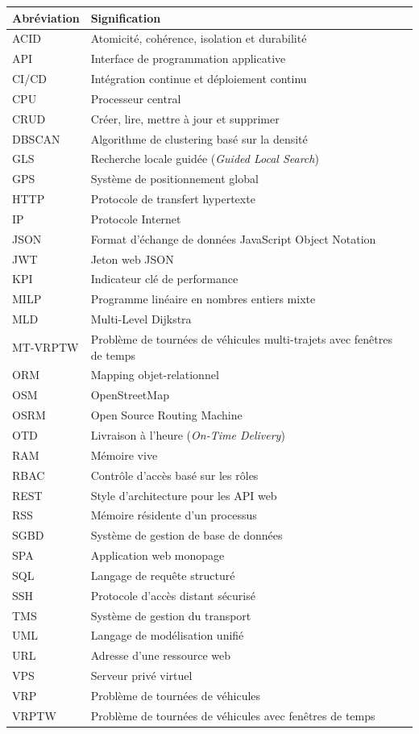 \documentclass[12pt,a4paper]{report}
\begin{document}
\begingroup
\small
{}
\begin{center}
\begin{tabular}{@{}p{3.2cm}p{10.8cm}@{}}
\toprule
\textbf{Abréviation} & \textbf{Signification} \\
\midrule
ACID & Atomicité, cohérence, isolation et durabilité \\
API & Interface de programmation applicative \\
CI/CD & Intégration continue et déploiement continu \\
CPU & Processeur central \\
CRUD & Créer, lire, mettre à jour et supprimer \\
DBSCAN & Algorithme de clustering basé sur la densité \\
GLS & Recherche locale guidée (\textit{Guided Local Search}) \\
GPS & Système de positionnement global \\
HTTP & Protocole de transfert hypertexte \\
IP & Protocole Internet \\
JSON & Format d'échange de données JavaScript Object Notation \\
JWT & Jeton web JSON \\
KPI & Indicateur clé de performance \\
MILP & Programme linéaire en nombres entiers mixte \\
MLD & Multi-Level Dijkstra \\
MT-VRPTW & Problème de tournées de véhicules multi-trajets avec fenêtres de temps \\
ORM & Mapping objet-relationnel \\
OSM & OpenStreetMap \\
OSRM & Open Source Routing Machine \\
OTD & Livraison à l'heure (\textit{On-Time Delivery}) \\
RAM & Mémoire vive \\
RBAC & Contrôle d'accès basé sur les rôles \\
REST & Style d'architecture pour les API web \\
RSS & Mémoire résidente d'un processus \\
SGBD & Système de gestion de base de données \\
SPA & Application web monopage \\
SQL & Langage de requête structuré \\
SSH & Protocole d'accès distant sécurisé \\
TMS & Système de gestion du transport \\
UML & Langage de modélisation unifié \\
URL & Adresse d'une ressource web \\
VPS & Serveur privé virtuel \\
VRP & Problème de tournées de véhicules \\
VRPTW & Problème de tournées de véhicules avec fenêtres de temps \\
\bottomrule
\end{tabular}
\end{center}
\endgroup
\clearpage
\end{document}
